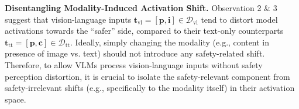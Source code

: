 \textbf{Disentangling Modality-Induced Activation Shift.}
Observation 2 \& 3 suggest that vision-language inputs $\mathbf{t}_\text{vl}=[\mathbf{p}, \mathbf{i}]\in\mathcal{D}_\text{vl}$ tend to distort model activations towards the ``safer'' side, compared to their text-only counterparts $\mathbf{t}_{\text{tt}} =[\mathbf{p}, \mathbf{c}]\in\mathcal{D}_\text{tt}$. Ideally, simply changing the modality (e.g., content in presence of image vs. text) should not introduce any safety-related shift.  Therefore, to allow VLMs process vision-language inputs without safety perception distortion, it is crucial to isolate the safety-relevant component from safety-irrelevant shifts (e.g., specifically to the modality itself) in their activation space. 

